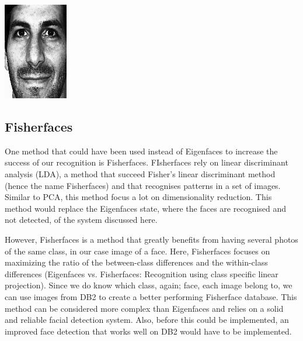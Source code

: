\begin{Figure}
  \centering
    \includegraphics[width=0.5\columnwidth]{images/im9_normalized.jpg}
\end{Figure}


\subsection{Fisherfaces}
One method that could have been used instead of Eigenfaces to increase the success of our recognition is Fisherfaces. FIsherfaces rely on linear discriminant analysis (LDA), a method that succeed Fisher's linear discriminant method (hence the name Fisherfaces) and that recognises patterns in a set of images. Similar to PCA, this method focus a lot on dimensionality reduction. This method would replace the Eigenfaces state, where the faces are recognised and not detected, of the system discussed here.

However, Fisherfaces is a method that greatly benefits from having several photos of the same class, in our case image of a face. Here, Fisherfaces focuses on maximizing the ratio of the between-class differences and the within-class differences (Eigenfaces vs. Fisherfaces: Recognition using class specific linear projection). Since we do know which class, again; face, each image belong to, we can use images from DB2 to create a better performing Fisherface database. This method can be considered more complex than Eigenfaces and relies on a solid and reliable facial detection system. Also, before this could be implemented, an improved face detection that works well on DB2 would have to be implemented.

